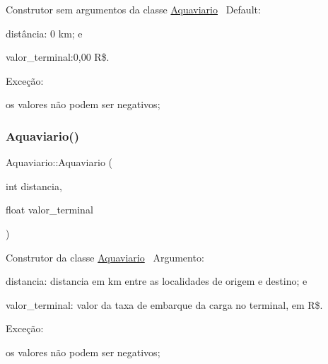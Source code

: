 Construtor sem argumentos da classe \hyperlink{classAquaviario}{Aquaviario}~\newline
 Default\+:~\newline

\begin{DoxyItemize}
\item distância\+: 0 km; e
\item valor\+\_\+terminal\+:0,00 R\$.~\newline

\end{DoxyItemize}

Exceção\+:
\begin{DoxyItemize}
\item os valores não podem ser negativos;
\end{DoxyItemize}\mbox{\label{classAquaviario_a331abedc032bba3076427a3e555dc6fd}} 
\subsubsection{\texorpdfstring{Aquaviario()}{Aquaviario()}\hspace{0.1cm}{\footnotesize\ttfamily [2/2]}}
{\footnotesize\ttfamily Aquaviario\+::\+Aquaviario (\begin{DoxyParamCaption}\item[{int}]{distancia,  }\item[{float}]{valor\+\_\+terminal }\end{DoxyParamCaption})}

Construtor da classe \hyperlink{classAquaviario}{Aquaviario}~\newline
 Argumento\+:
\begin{DoxyItemize}
\item distancia\+: distancia em km entre as localidades de origem e destino; e
\item valor\+\_\+terminal\+: valor da taxa de embarque da carga no terminal, em R\$.~\newline

\end{DoxyItemize}

Exceção\+:
\begin{DoxyItemize}
\item os valores não podem ser negativos;
\end{DoxyItemize}\mbox{\label{classAquaviario_a71c1378131f32535dcad3e714e643c1d}} 
